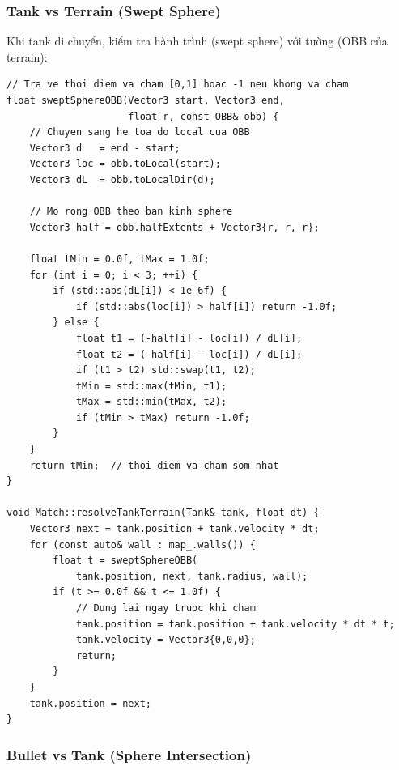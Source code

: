 \documentclass[12pt,a4paper]{report}
\begin{document}
\subsubsection{Tank vs Terrain (Swept Sphere)}

Khi tank di chuyển, kiểm tra hành trình (swept sphere) với tường (OBB của terrain):

\begin{lstlisting}[style=cppStyle, caption={Swept sphere collision với terrain OBB}, label={lst:swept}]
// Tra ve thoi diem va cham [0,1] hoac -1 neu khong va cham
float sweptSphereOBB(Vector3 start, Vector3 end,
                     float r, const OBB& obb) {
    // Chuyen sang he toa do local cua OBB
    Vector3 d   = end - start;
    Vector3 loc = obb.toLocal(start);
    Vector3 dL  = obb.toLocalDir(d);

    // Mo rong OBB theo ban kinh sphere
    Vector3 half = obb.halfExtents + Vector3{r, r, r};

    float tMin = 0.0f, tMax = 1.0f;
    for (int i = 0; i < 3; ++i) {
        if (std::abs(dL[i]) < 1e-6f) {
            if (std::abs(loc[i]) > half[i]) return -1.0f;
        } else {
            float t1 = (-half[i] - loc[i]) / dL[i];
            float t2 = ( half[i] - loc[i]) / dL[i];
            if (t1 > t2) std::swap(t1, t2);
            tMin = std::max(tMin, t1);
            tMax = std::min(tMax, t2);
            if (tMin > tMax) return -1.0f;
        }
    }
    return tMin;  // thoi diem va cham som nhat
}

void Match::resolveTankTerrain(Tank& tank, float dt) {
    Vector3 next = tank.position + tank.velocity * dt;
    for (const auto& wall : map_.walls()) {
        float t = sweptSphereOBB(
            tank.position, next, tank.radius, wall);
        if (t >= 0.0f && t <= 1.0f) {
            // Dung lai ngay truoc khi cham
            tank.position = tank.position + tank.velocity * dt * t;
            tank.velocity = Vector3{0,0,0};
            return;
        }
    }
    tank.position = next;
}
\end{lstlisting}

\subsubsection{Bullet vs Tank (Sphere Intersection)}
\end{document}
